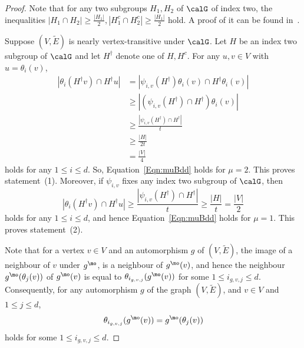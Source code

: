 \begin{proof}
Note that for any two subgroups $H_1, H_2$ of $\calG$ of index two, the inequalities 
$|H_1\cap H_2| \geq \frac{|H_1|}{2}, |H_1^c\cap H_2^c| \geq \frac{|H_1|}{2}$
hold. A proof of it can be found in~\cite{CheegerTwisted}.

Suppose $(V, \widetilde E)$ is nearly vertex-transitive under $\calG$. Let $H$ be an index two subgroup of $\calG$ and let $H^\dag$ denote one of $H, H^c$. For any $u,v\in V$ with $u = \theta_i(v)$, 
\begin{align*}
|\theta_i(H^\dag v) \cap H^\dag u|
& = |\psi_{i,v} (H^\dag) \theta_i(v) \cap H^\dag \theta_i(v)|\\
& \geq |(\psi_{i,v} (H^\dag) \cap H^\dag) \theta_i(v)| \\
& \geq \frac{|\psi_{i,v} (H^\dag) \cap H^\dag|}{t} \\
& \geq \frac{|H|}{2t} \\
&= \frac{|V|}{4}
\end{align*}
holds for any $1\leq i \leq d$. So, Equation~\eqref{Eqn:muBdd} holds for $\mu = 2$. This proves statement~(1). Moreover, if $\psi_{i, v}$ fixes any index two subgroup of $\calG$, then 
$$
|\theta_i(H^\dag v) \cap H^\dag u|
\geq
\frac{|\psi_{i,v} (H^\dag) \cap H^\dag|}{t} 
 \geq \frac{|H|}{t}
 = \frac{|V|}{2}
$$
holds for any $1\leq i \leq d$, and hence Equation~\eqref{Eqn:muBdd} holds for $\mu = 1$. This proves statement~(2). 

Note that for a vertex $v \in V$ and an automorphism $g$ of $(V, \widetilde E)$, the image of a neighbour of $v$ under $g^\mo$, is a neighbour of $g^\mo (v)$, and hence the neighbour $g^\mo (\theta_j(v))$ of $g^\mo(v)$ is equal to $\theta_{i_{g, v, j}} (g^\mo(v))$ for some $1\leq i_{g, v, j} \leq d$. Consequently, for any automorphism $g$ of the graph $(V, \widetilde E)$, and $v\in V$ and $1\leq j \leq d$, 
\[\theta_{i_{g, v, j}} (g^\mo (v)) = g^\mo (\theta_j(v))\]
holds for some $1\leq i_{g, v, j} \leq d$.


\end{proof}
